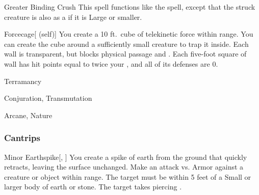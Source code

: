 \lowercase{\hypertarget{spell:Greater Binding Crush}{}}\label{spell:Greater Binding Crush}
\begin{apability}[\nth{5}]{\hypertarget{spell:Greater Binding Crush}{Greater Binding Crush}}
This spell functions like the  spell, except that the struck creature is also  as a  if it is Large or smaller.
\end{apability}
\vspace{0.25em}



\lowercase{\hypertarget{spell:Forcecage}{}}\label{spell:Forcecage}
\begin{attuneability}[\nth{7}]{\hypertarget{spell:Forcecage}{Forcecage}}[ (self)]
You create a 10 ft.\ cube of telekinetic force within \rngmed range.
You can create the cube around a sufficiently small creature to trap it inside.
Each wall is transparent, but blocks physical passage and .
Each five-foot square of wall has hit points equal to twice your , and all of its defenses are 0.
\end{attuneability}
\vspace{0.25em}


\newpage
\begin{spellsection}{Terramancy}

\begin{spellheader}
\end{spellheader}


 Conjuration, Transmutation

 Arcane, Nature

\subsubsection{Cantrips}


\begin{freeability}{Minor Earthspike}[, ]
You create a spike of earth from the ground that quickly retracts, leaving the surface unchanged.
Make an attack vs. Armor against a creature or object within \rngmed range.
The target must be within 5 feet of a Small or larger body of earth or stone.
\hit The target takes piercing .
\end{freeability}

\end{spellsection}


